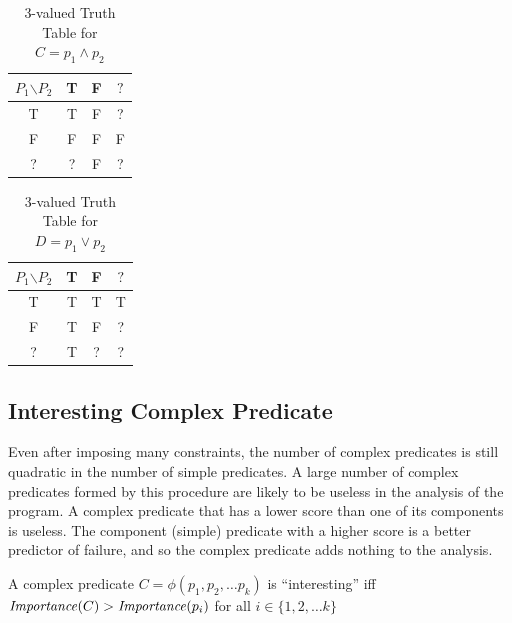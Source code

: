 \begin{table}
\caption{3-valued Truth Table for $C = p_1 \wedge p_2$}
\label{tab:and}
\centering
\scriptsize
  
\begin{tabular}{c|ccc}
  $P_1$$\backslash$$P_2$ & T & F & $?$ \\
  \hline
  T & T & F & ? \\
  F & F & F & F \\
  ? & ? & F & ? \\
\end{tabular}
\end{table}


\begin{table}
\caption{3-valued Truth Table for $D = p_1 \vee p_2$}
\label{tab:or}
\centering
\scriptsize
  
  \centering
  \begin{tabular}{c|ccc}
  $P_1$$\backslash$$P_2$ & T & F & $?$ \\
  \hline
  T & T & T & T \\
  F & T & F & ? \\
  ? & T & ? & ? \\
\end{tabular}
\end{table}

\subsection{Interesting Complex Predicate}

Even after imposing many constraints, the number of complex predicates is still quadratic in the number of simple predicates.  A large number of complex predicates formed by this procedure are likely to be useless in the analysis of the program.  A complex predicate that has a lower score than one of its components is useless.  The component (simple) predicate with a higher score is a better predictor of failure, and so the complex predicate adds nothing to the analysis.

\begin{defn}
\label{dfn3}
A complex predicate $C = \phi(p_1, p_2, \ldots p_k)$ is ``interesting'' iff $\mathit{Importance}(C) > \mathit{Importance}(p_i)$ for all $i \in \{1, 2, \ldots k\}$
\end{defn}

